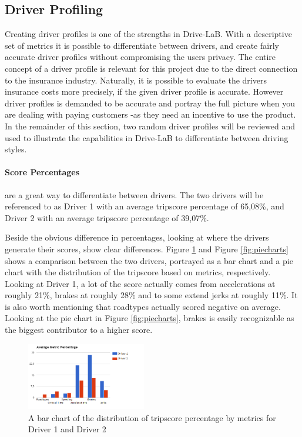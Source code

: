 \subsection{Driver Profiling}\label{subsec:userprofiling}

Creating driver profiles is one of the strengths in Drive-LaB. With a descriptive set of metrics it is possible to differentiate between drivers, and create fairly accurate driver profiles without compromising the users privacy. The entire concept of a driver profile is relevant for this project due to the direct connection to the insurance industry. Naturally, it is possible to evaluate the drivers insurance costs more precisely, if the given driver profile is accurate. However driver profiles is demanded to be accurate and portray the full picture when you are dealing with paying customers\citep{art:insurtelematics} -as they need an incentive to use the product. In the remainder of this section, two random driver profiles will be reviewed and used to illustrate the capabilities in Drive-LaB to differentiate between driving styles.  

\paragraph{Score Percentages} are a great way to differentiate between drivers. The two drivers will be referenced to as Driver 1 with an average tripscore percentage of 65,08\%, and Driver 2 with an average tripscore percentage of 39,07\%.

Beside the obvious difference in percentages, looking at where the drivers generate their scores, show clear differences. Figure \ref{fig:avgmetricper} and Figure \ref{fig:piecharts} shows a comparison between the two drivers, portrayed as a bar chart and a pie chart with the distribution of the tripscore based on metrics, respectively. Looking at Driver 1, a lot of the score actually comes from accelerations at roughly 21\%, brakes at roughly 28\% and to some extend jerks at roughly 11\%. It is also worth mentioning that roadtypes actually scored negative on average. Looking at the pie chart in Figure \ref{fig:piecharts}, brakes is easily recognizable as the biggest contributor to a higher score.

\begin{figure}[tb]
\centering
\includegraphics[width=0.465\textwidth]{Pictures/AverageMetricsPercentage}
\caption{A bar chart of the distribution of tripscore percentage by metrics for Driver 1 and Driver 2}
\label{fig:avgmetricper}
\end{figure}

